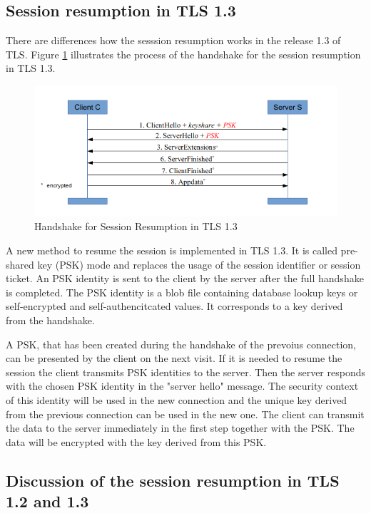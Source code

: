 \subsection{Session resumption in TLS 1.3}
\label{subsec:resumption1_3}

There are differences how the sesssion resumption works in the release 1.3 of TLS. Figure \ref{fig:resumption1_3} illustrates the process of the handshake for the session resumption in TLS 1.3.

\begin{figure}[H]
	\centering
		\includegraphics[scale=0.8]{images/resumption1_3.png}
	\caption{Handshake for Session Resumption in TLS 1.3 \cite{Hassenstein}}
	\label{fig:resumption1_3}
\end{figure}

A new method to resume the session is implemented in TLS 1.3. It is called pre-shared key (PSK) mode and replaces the usage of the session identifier or session ticket. An PSK identity is sent to the client by the server after the full handshake is completed. The PSK identity is a blob file containing database lookup keys or self-encrypted and self-authencitcated values. It corresponds to a key derived from the handshake.

A PSK, that has been created during the handshake of the prevoius connection, can be presented by the client on the next visit. If it is needed to resume the session the client transmits PSK identities to the server. Then the server responds with the chosen PSK identity in the "server hello" message. The security context of this identity will be used in the new connection and the unique key derived from the previous connection can be used in the new one. 
The client can transmit the data to the server immediately in the first step together with the PSK. The data will be encrypted with the key derived from this PSK. \cite{ldapwiki:resumption}

\subsection{Discussion of the session resumption in TLS 1.2 and 1.3}
\label{subsec:discussion_resumption}


